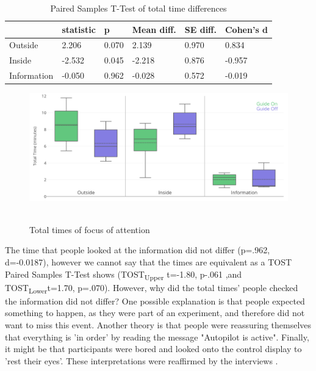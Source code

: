 \begin{table}[]
\label{tab:totalVideo}
  \caption{Paired Samples T-Test of total time differences}
\begin{tabular}{@{}llllll@{}}
\toprule
 & statistic &  p & Mean diff. & SE diff. & Cohen's d \\ \midrule
Outside & 2.206 &  0.070 & 2.139 & 0.970 & 0.834 \\
Inside & -2.532 &  0.045 & -2.218 & 0.876 & -0.957 \\
Information & -0.050 &  0.962 & -0.028 & 0.572 & -0.019 \\ \bottomrule
\end{tabular}
\end{table}

\begin{figure}
    \includegraphics[width=1\textwidth]{fig/Total.png}\hfill\
    \caption[Times of Attention]{Total times of focus of attention}
    \label{fig:attentionTotal}
\end{figure}

The time that people looked at the information did not differ (p=.962, d=-0.0187), however we cannot say that the times are equivalent as a TOST \citep{Mara2012Paired-samplesEquivalence} Paired Samples T-Test shows
(TOST\textsubscript{Upper} t=-1.80, p-.061 ,and TOST\textsubscript{Lower}t=1.70, p=.070).
However, why did the total times' people checked the information did not differ? One possible explanation is that people expected something to happen, as they were part of an experiment, and therefore did not want to miss this event. Another theory is that people were reassuring themselves that everything is 'in order' by reading the message "Autopilot is active". Finally, it might be that participants were bored and looked onto the control display to 'rest their eyes'. These interpretations were reaffirmed by the interviews \emph{}. 

